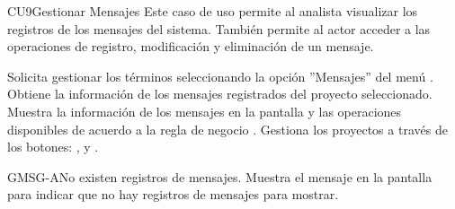 	\begin{UseCase}{CU9}{Gestionar Mensajes}{
	Este caso de uso permite al analista visualizar los registros de los mensajes del sistema. También permite al actor acceder a las operaciones de registro, modificación y eliminación de un mensaje.
	}
\end{UseCase}
\begin{UCtrayectoria}
	\UCpaso[\UCactor] Solicita gestionar los términos seleccionando la opción ''Mensajes'' del menú .
	\UCpaso[\UCsist] Obtiene la información de los mensajes registrados del proyecto seleccionado. 
	\UCpaso[\UCsist] Muestra la información de los mensajes en la pantalla  y las operaciones disponibles de acuerdo a la regla de negocio .
	\UCpaso[\UCactor] Gestiona los proyectos a través de los botones: , \editar y \eliminar. \label{CU9-P4}
\end{UCtrayectoria}		
\begin{UCtrayectoriaA}{GMSG-A}{No existen registros de mensajes.}
	\UCpaso[\UCsist] Muestra el mensaje  en la pantalla  para indicar que no hay registros de mensajes para mostrar.
\end{UCtrayectoriaA}


